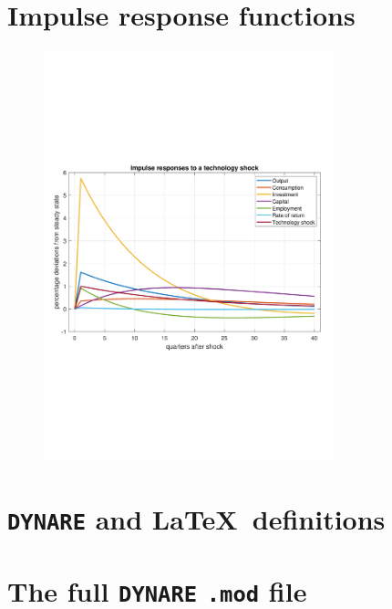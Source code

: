 \documentclass[12pt]{article}
\begin{document}
 
 



\section{Impulse response functions}

\begin{figure}[hpb]\centering \vskip-1in
\includegraphics[width=0.75\textwidth]{basicrbc_fig.pdf}
\end{figure}


\section{\texttt{DYNARE} and \LaTeX ~definitions}
\nopagebreak

{\footnotesize
 
% 
}


\section{The full \texttt{DYNARE} \texttt{.mod} file}

\nopagebreak
{\footnotesize

}
\end{document}
